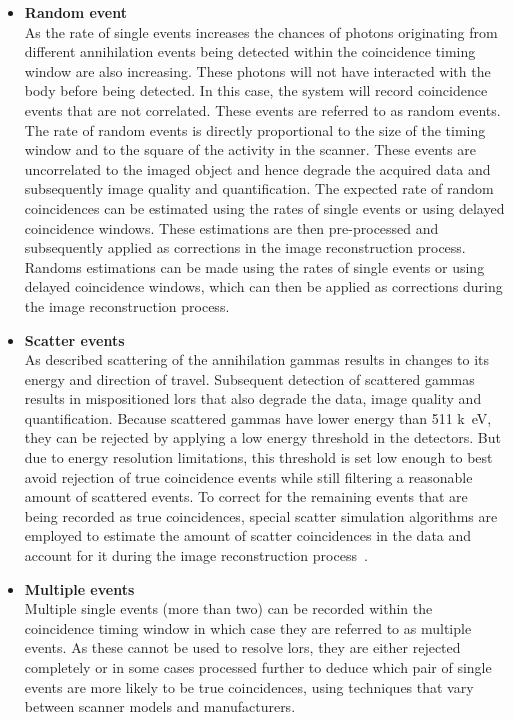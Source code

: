 \begin{itemize}
\item\textbf{Random event}\\
As the rate of single events increases the chances of photons originating from different annihilation events being detected within the coincidence timing window are also increasing. These photons will not have interacted with the body before being detected.
In this case, the system will record coincidence events that are not correlated. These events are referred to as random events. 
The rate of random events is directly proportional to the size of the timing window and to the square of the activity in the scanner. These events are uncorrelated to the imaged object and hence degrade the acquired data and subsequently image quality and quantification.  
The expected rate of random coincidences can be estimated using the rates of single events or using delayed coincidence windows. These estimations are then pre-processed and subsequently applied as corrections in the image reconstruction process. 
Randoms estimations can be made using the rates of single events or using delayed coincidence windows, which can then be applied as corrections during the image reconstruction process. 
%
%
\item\textbf{Scatter events}\\
As described scattering of the annihilation gammas results in changes to its energy and direction of travel. Subsequent detection of scattered gammas results in mispositioned \glspl{lor} that also degrade the data, image quality and quantification. 
Because scattered gammas have lower energy than 511 \si{k\electronvolt}, they can be rejected by applying a low energy threshold in the detectors. But due to energy resolution limitations, this threshold is set low enough to best avoid rejection of true coincidence events while still filtering a reasonable amount of scattered events.
To correct for the remaining events that are being recorded as true coincidences, special scatter simulation algorithms are employed to estimate the amount of scatter coincidences in the data and account for it during the image reconstruction process~\cite{Watson1996,Polycarpou2011}.
%
\item\textbf{Multiple events}\\
Multiple single events (more than two) can be recorded within the coincidence timing window in which case they are referred to as multiple events. As these cannot be used to resolve \glspl{lor}, they are either rejected completely or in some cases processed further to deduce which pair of single events are more likely to be true coincidences, using techniques that vary between scanner models and manufacturers. 

\end{itemize}
